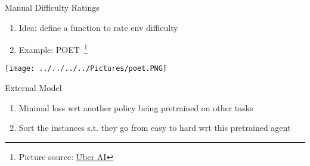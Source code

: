 \begin{frame}[c]{Manual Difficulty Ratings}
	
	\begin{enumerate}
		\item Idea: define a function to rate env difficulty
		\item Example: POET~\footnote{Picture source: \href{https://eng.uber.com/poet-open-ended-deep-learning/}{Uber AI}}
	\end{enumerate}
	\centering
	
	\texttt{[image: ../../../../Pictures/poet.PNG]}			
\end{frame}

\begin{frame}[c]{External Model}
	
	\begin{enumerate}
		\item Minimal loss wrt another policy being pretrained on other tasks
		\item Sort the instances s.t. they go from easy to hard wrt this pretrained agent~
	\end{enumerate}
	
\end{frame}

